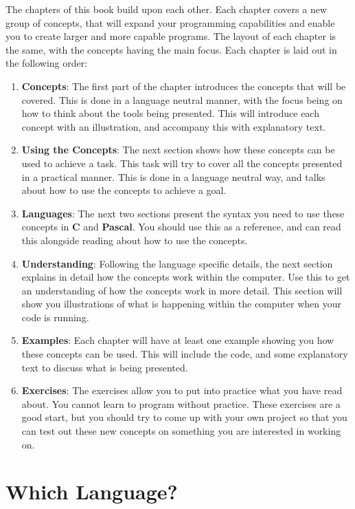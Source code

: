 The chapters of this book build upon each other. Each chapter covers a new group of concepts, that will expand your programming capabilities and enable you to create larger and more capable programs. The layout of each chapter is the same, with the concepts having the main focus. Each chapter is laid out in the following order:
\begin{enumerate}
  \item \textbf{Concepts}: The first part of the chapter introduces the concepts that will be covered. This is done in a language neutral manner, with the focus being on how to think about the tools being presented. This will introduce each concept with an illustration, and accompany this with explanatory text.
  \item \textbf{Using the Concepts}: The next section shows how these concepts can be used to achieve a task. This task will try to cover all the concepts presented in a practical manner. This is done in a language neutral way, and talks about how to use the concepts to achieve a goal.
  \item \textbf{Languages}: The next two sections present the syntax you need to use these concepts in \textbf{C} and \textbf{Pascal}. You should use this as a reference, and can read this alongside reading about how to use the concepts.
  \item \textbf{Understanding}: Following the language specific details, the next section explains in detail how the concepts work within the computer. Use this to get an understanding of how the concepts work in more detail. This section will show you illustrations of what is happening within the computer when your code is running.
  \item \textbf{Examples}: Each chapter will have at least one example showing you how these concepts can be used. This will include the code, and some explanatory text to discuss what is being presented.
  \item \textbf{Exercises}: The exercises allow you to put into practice what you have read about. You cannot learn to program without practice. These exercises are a good start, but you should try to come up with your own project so that you can test out these new concepts on something you are interested in working on.
\end{enumerate}

\section*{Which Language?} %
\label{sec:which_language_}

